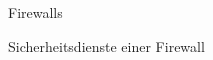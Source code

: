 \begin{section}{Firewalls}
\begin{subsection}{Sicherheitsdienste einer Firewall}
  	\DIFaddend \begin{figure}[htbp]
		\centering
\end{figure}
\end{subsection}
\end{section}
